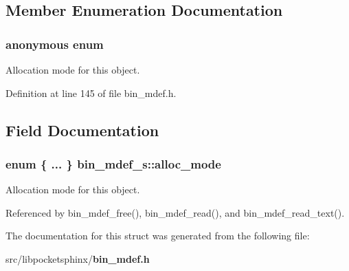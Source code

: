\subsection{Member Enumeration Documentation}
\subsubsection[{anonymous enum}]{\setlength{\rightskip}{0pt plus 5cm}anonymous enum}\label{structbin__mdef__s_aecae45462313d38bc6474d8ee57fe9f3}


Allocation mode for this object. 



Definition at line 145 of file bin\-\_\-mdef.\-h.



\subsection{Field Documentation}
\subsubsection[{alloc\-\_\-mode}]{\setlength{\rightskip}{0pt plus 5cm}enum \{ ... \}   bin\-\_\-mdef\-\_\-s\-::alloc\-\_\-mode}\label{structbin__mdef__s_ab8d852b6cc4f9899da72da03d1607c92}


Allocation mode for this object. 



Referenced by bin\-\_\-mdef\-\_\-free(), bin\-\_\-mdef\-\_\-read(), and bin\-\_\-mdef\-\_\-read\-\_\-text().



The documentation for this struct was generated from the following file\-:\begin{DoxyCompactItemize}
\item 
src/libpocketsphinx/{\bf bin\-\_\-mdef.\-h}\end{DoxyCompactItemize}
